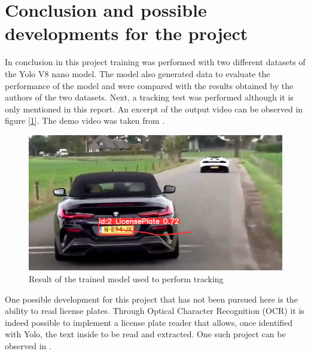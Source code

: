 \documentclass[12pt]{article}
\begin{document}
\section{Conclusion and possible developments for the project}
In conclusion in this project training was performed with two different datasets of the Yolo V8 nano model. The model also generated data to evaluate the performance of the model and were compared with the results obtained by the authors of the two datasets. Next, a tracking test was performed although it is only mentioned in this report. An excerpt of the output video can be observed in figure [\ref{fig:mesh5}]. The demo video was taken from \cite{github2}.

\begin{figure}[H]
    \centering
    \includegraphics[width=0.5\linewidth]{tracking example.png}
    \caption{Result of the trained model used to perform tracking}
    \label{fig:mesh5}
\end{figure}
One possible development for this project that has not been pursued here is the ability to read license plates. Through Optical Character Recognition (OCR) it is indeed possible to implement a license plate reader that allows, once identified with Yolo, the text inside to be read and extracted. One such project can be observed in \cite{github1}.


\clearpage


\begin{flushleft}
  
\end{flushleft}

\end{document}
